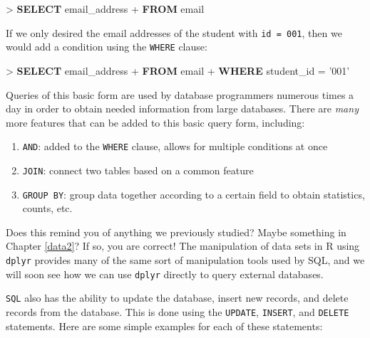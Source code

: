 \documentclass[]{krantz}
\makeatletter
\newenvironment{Shaded}{\begin{snugshade}}{\end{snugshade}}
\newcommand{\KeywordTok}[1]{\textcolor[rgb]{0.27,0.27,0.27}{\textbf{#1}}}
\newcommand{\NormalTok}[1]{#1}
\newcommand{\StringTok}[1]{\textcolor[rgb]{0.5,0.5,0.5}{#1}}
\providecommand{\tightlist}{%
  \setlength{\itemsep}{0pt}\setlength{\parskip}{0pt}}
\newenvironment{kframe}{%
\medskip{}
\setlength{\fboxsep}{.8em}
 \def\at@end@of@kframe{}%
 \ifinner\ifhmode%
  \def\at@end@of@kframe{\end{minipage}}%
  \begin{minipage}{\columnwidth}%
 \fi\fi%
 \def\FrameCommand##1{\hskip\@totalleftmargin \hskip-\fboxsep
 \colorbox{shadecolor}{##1}\hskip-\fboxsep
     \hskip-\linewidth \hskip-\@totalleftmargin \hskip\columnwidth}%
 \MakeFramed {\advance\hsize-\width
   \@totalleftmargin\z@ \linewidth\hsize
   \@setminipage}}%
 {\par\unskip\endMakeFramed%
 \at@end@of@kframe}
\renewenvironment{Shaded}{\begin{kframe}}{\end{kframe}}
\makeatother
\begin{document}
\begin{Shaded}
\begin{Highlighting}[]
\NormalTok{> }\KeywordTok{SELECT}\NormalTok{ email_address}
\NormalTok{+ }\KeywordTok{FROM}\NormalTok{ email}
\end{Highlighting}
\end{Shaded}

If we only desired the email addresses of the student with \texttt{id\ =\ 001}, then we would add a condition using the \texttt{WHERE} clause:

\begin{Shaded}
\begin{Highlighting}[]
\NormalTok{> }\KeywordTok{SELECT}\NormalTok{ email_address}
\NormalTok{+ }\KeywordTok{FROM}\NormalTok{ email}
\NormalTok{+ }\KeywordTok{WHERE}\NormalTok{ student_id = }\StringTok{'001'}
\end{Highlighting}
\end{Shaded}

Queries of this basic form are used by database programmers numerous times a day in order to obtain needed information from large databases. There are \emph{many} more features that can be added to this basic query form, including:

\begin{enumerate}
\def\labelenumi{\arabic{enumi}.}
\tightlist
\item
  \texttt{AND}: added to the \texttt{WHERE} clause, allows for multiple conditions at once
\item
  \texttt{JOIN}: connect two tables based on a common feature
\item
  \texttt{GROUP\ BY}: group data together according to a certain field to obtain statistics, counts, etc.
\end{enumerate}

Does this remind you of anything we previously studied? Maybe something in Chapter \ref{data2}? If so, you are correct! The manipulation of data sets in R using \texttt{dplyr} provides many of the same sort of manipulation tools used by SQL, and we will soon see how we can use \texttt{dplyr} directly to query external databases.

\texttt{SQL} also has the ability to update the database, insert new records, and delete records from the database. This is done using the \texttt{UPDATE}, \texttt{INSERT}, and \texttt{DELETE} statements. Here are some simple examples for each of these statements:
\end{document}
